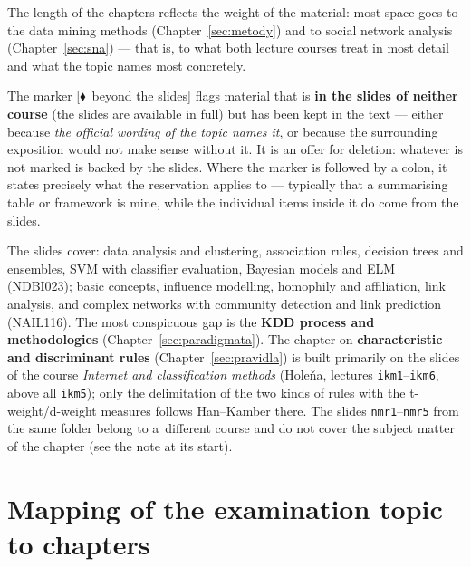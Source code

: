 \documentclass[11pt,a4paper]{article}
\theoremstyle{definition}
\newcommand{\mimo}{\textcolor{markcol}{\textsf{\footnotesize[$\blacklozenge$~beyond the slides]}}}
\begin{document}
\begin{center}
\begin{minipage}{0.92\textwidth}
\begin{poznbox}
\small
The length of the chapters reflects the weight of the material: most space goes to the
data mining methods (Chapter~\ref{sec:metody}) and to social network analysis
(Chapter~\ref{sec:sna}) --- that is, to what both lecture courses treat in most detail and what
the topic names most concretely.

The marker \mimo{} flags material that is \textbf{in the slides of neither course} (the slides
are available in full) but has been kept in the text --- either because \emph{the official
wording of the topic names it}, or because the surrounding exposition would not make sense
without it. It is an offer for deletion: whatever is not marked is backed by the slides. Where
the marker is followed by a colon, it states precisely what the reservation applies to ---
typically that a summarising table or framework is mine, while the individual items inside it do
come from the slides.

The slides cover: data analysis and clustering, association rules, decision trees and
ensembles, SVM with classifier evaluation, Bayesian models and ELM (NDBI023); basic concepts,
influence modelling, homophily and affiliation, link analysis, and complex networks with
community detection and link prediction (NAIL116). The most conspicuous gap is the
\textbf{KDD process and methodologies} (Chapter~\ref{sec:paradigmata}). The chapter on
\textbf{characteristic and discriminant rules} (Chapter~\ref{sec:pravidla}) is built
primarily on the slides of the course \emph{Internet and classification methods}
(Holeňa, lectures \texttt{ikm1}--\texttt{ikm6}, above all \texttt{ikm5}); only the
delimitation of the two kinds of rules with the t-weight/d-weight measures follows
Han--Kamber there. The slides \texttt{nmr1}--\texttt{nmr5} from the same folder belong
to a~different course and do not cover the subject matter of the chapter (see the note
at its start).
\end{poznbox}
\end{minipage}
\end{center}

\vspace{2mm}

\section*{Mapping of the examination topic to chapters}
\end{document}
